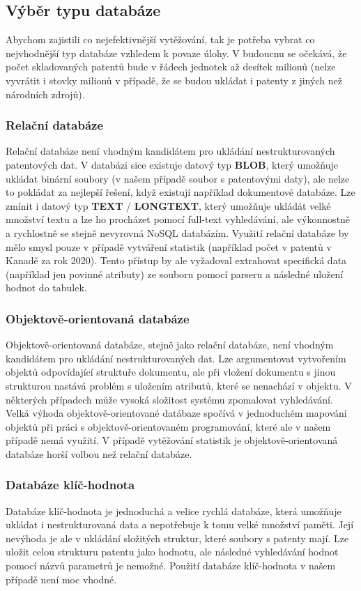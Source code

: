 \subsection{Výběr typu databáze}
Abychom zajistili co nejefektivnější vytěžování, tak je potřeba vybrat co nejvhodnější typ databáze vzhledem k povaze úlohy. V budoucnu se očekává, že počet skladovaných patentů bude v řádech jednotek až desítek milionů (nelze vyvrátit i stovky milionů v případě, že se budou ukládat i patenty z jiných než národních zdrojů).

\subsubsection{Relační databáze}
Relační databáze není vhodným kandidátem pro ukládání nestrukturovaných patentových dat. V databázi sice existuje datový typ \textbf{BLOB}, který umožňuje ukládat binární soubory (v našem případě soubor s patentovými daty), ale nelze to pokládat za nejlepší řešení, když existují například dokumentové databáze. Lze zmínit i datový typ \textbf{TEXT} / \textbf{LONGTEXT}, který umožňuje ukládát velké množství textu a lze ho procházet pomocí full-text vyhledávání, ale výkonnostně a rychlostně se stejně nevyrovná NoSQL databázím. 
\newline
\indent Využití relační databáze by mělo smysl pouze v případě vytváření statistik (například počet v patentů v Kanadě za rok 2020). Tento přístup by ale vyžadoval extrahovat specifická data (například jen povinné atributy) ze souboru pomocí parseru a následné uložení hodnot do tabulek. 

\subsubsection{Objektově-orientovaná databáze}
Objektově-orientovaná databáze, stejně jako relační databáze, není vhodným kandidátem pro ukládání nestrukturovaných dat. Lze argumentovat vytvořením objektů odpovídající struktuře dokumentu, ale při vložení dokumentu s jinou strukturou nastává problém s uložením atributů, které se nenachází v objektu. V některých případech může vysoká složitost systému zpomalovat vyhledávání. Velká výhoda objektově-orientované datábaze spočívá v jednoduchém mapování objektů při práci s objektově-orientovaném programování, které ale v našem případě nemá využití. V případě vytěžování statistik je objektově-orientovaná databáze horší volbou než relační databáze.

\subsubsection{Databáze klíč-hodnota}
Databáze klíč-hodnota je jednoduchá a velice rychlá databáze, která umožňuje ukládat i nestrukturovaná data a nepotřebuje k tomu velké množství paměti. Její nevýhoda je ale v ukládání složitých struktur, které soubory s patenty mají. Lze uložit celou strukturu patentu jako hodnotu, ale následné vyhledávání hodnot pomocí názvů parametrů je nemožné. Použití databáze klíč-hodnota v našem případě není moc vhodné.

